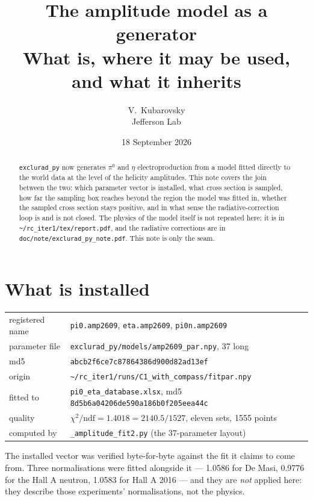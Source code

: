 \documentclass[11pt,a4paper]{article}
\title{\textbf{The amplitude model as a generator}\\[2mm]
\large What \code{amp2609} is, where it may be used, and what it inherits}
\author{V.\ Kubarovsky\\ \small Jefferson Lab}
\date{18 September 2026}
\newcommand{\code}[1]{\texttt{#1}}
\begin{document}
\maketitle

\begin{abstract}
\noindent
\code{exclurad\_py} now generates $\pi^0$ and $\eta$ electroproduction from a
model fitted directly to the world data at the level of the helicity amplitudes.
This note covers the join between the two: which parameter vector is installed,
what cross section is sampled, how far the sampling box reaches beyond the
region the model was fitted in, whether the sampled cross section stays
positive, and in what sense the radiative-correction loop is and is not closed.
The physics of the model itself is not repeated here; it is in
\code{\textasciitilde/rc\_iter1/tex/report.pdf}, and the radiative corrections
are in \code{doc/note/exclurad\_py\_note.pdf}.  This note is only the seam.
\end{abstract}

\section{What is installed}

\begin{center}
\begin{tabular}{ll}
\toprule
registered name & \code{pi0.amp2609}, \code{eta.amp2609}, \code{pi0n.amp2609}\\
parameter file & \code{exclurad\_py/models/amp2609\_par.npy}, 37 long\\
md5 & \code{abcb2f6ce7c87864386d900d82ad13ef}\\
origin & \code{\textasciitilde/rc\_iter1/runs/C1\_with\_compass/fitpar.npy}\\
fitted to & \code{pi0\_eta\_database.xlsx}, md5 \code{8d5b6a04206de590a186b0f205eea44c}\\
quality & $\chi^2/\mathrm{ndf} = 1.4018 = 2140.5/1527$, eleven sets, 1555 points\\
computed by & \code{\_amplitude\_fit2.py} (the 37-parameter layout)\\
\bottomrule
\end{tabular}
\end{center}

\noindent
The installed vector was verified byte-for-byte against the fit it claims to
come from.  Three normalisations were fitted alongside it --- 1.0586 for De
Masi, 0.9776 for the Hall A neutron, 1.0583 for Hall A 2016 --- and they are
\emph{not} applied here: they describe those experiments' normalisations, not
the physics.
\end{document}
